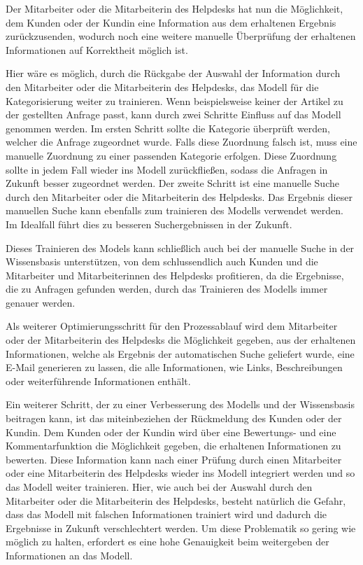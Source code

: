 Der Mitarbeiter oder die Mitarbeiterin des Helpdesks hat nun die Möglichkeit, dem Kunden oder der Kundin eine Information aus dem erhaltenen Ergebnis zurückzusenden, wodurch noch eine weitere manuelle Überprüfung der erhaltenen Informationen auf Korrektheit möglich ist. 

Hier wäre es möglich, durch die Rückgabe der Auswahl der Information durch den Mitarbeiter oder die Mitarbeiterin des Helpdesks, das Modell für die Kategorisierung weiter zu trainieren. Wenn beispielsweise keiner der Artikel zu der gestellten Anfrage passt, kann durch zwei Schritte Einfluss auf das Modell genommen werden. Im ersten Schritt sollte die Kategorie überprüft werden, welcher die Anfrage zugeordnet wurde. Falls diese Zuordnung falsch ist, muss eine manuelle Zuordnung zu einer passenden Kategorie erfolgen. Diese Zuordnung sollte in jedem Fall wieder ins Modell zurückfließen, sodass die Anfragen in Zukunft besser zugeordnet werden. Der zweite Schritt ist eine manuelle Suche durch den Mitarbeiter oder die Mitarbeiterin des Helpdesks. Das Ergebnis dieser manuellen Suche kann ebenfalls zum trainieren des Modells verwendet werden. Im Idealfall führt dies zu besseren Suchergebnissen in der Zukunft.

Dieses Trainieren des Models kann schließlich auch bei der manuelle Suche in der Wissensbasis unterstützen, von dem schlussendlich auch Kunden und die Mitarbeiter und Mitarbeiterinnen des Helpdesks profitieren, da die Ergebnisse, die zu Anfragen gefunden werden, durch das Trainieren des Modells immer genauer werden.

Als weiterer Optimierungsschritt für den Prozessablauf wird dem Mitarbeiter oder der Mitarbeiterin des Helpdesks die Möglichkeit gegeben, aus der erhaltenen Informationen, welche als Ergebnis der automatischen Suche geliefert wurde, eine E-Mail generieren zu lassen, die alle Informationen, wie Links, Beschreibungen oder weiterführende Informationen enthält.

Ein weiterer Schritt, der zu einer Verbesserung des Modells und der Wissensbasis beitragen kann, ist das miteinbeziehen der Rückmeldung des Kunden oder der Kundin. Dem Kunden oder der Kundin wird über eine Bewertungs- und eine Kommentarfunktion die Möglichkeit gegeben, die erhaltenen Informationen zu bewerten. Diese Information kann nach einer Prüfung durch einen Mitarbeiter oder eine Mitarbeiterin des Helpdesks wieder ins Modell integriert werden und so das Modell weiter trainieren. Hier, wie auch bei der Auswahl durch den Mitarbeiter oder die Mitarbeiterin des Helpdesks, besteht natürlich die Gefahr, dass das Modell mit falschen Informationen trainiert wird und dadurch die Ergebnisse in Zukunft verschlechtert werden. Um diese Problematik so gering wie möglich zu halten, erfordert es eine hohe Genauigkeit beim weitergeben der Informationen an das Modell.


